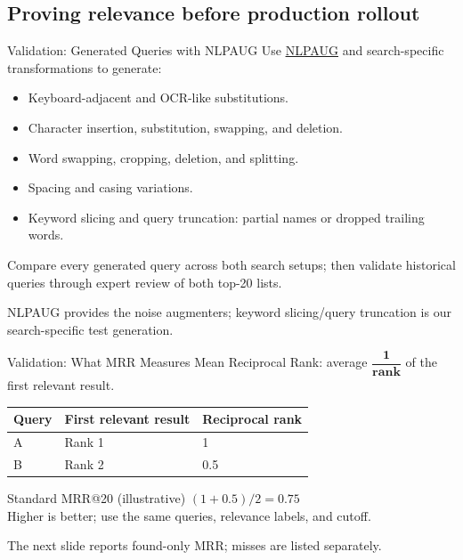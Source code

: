 \documentclass[aspectratio=169]{beamer}
\begin{document}
\subsection{Proving relevance before production rollout}

\begin{frame}{Validation: Generated Queries with NLPAUG}
  \hypertarget{sec:validation}{}
  Use \href{https://github.com/makcedward/nlpaug}{\underline{NLPAUG}} and search-specific transformations to generate:
  \begin{itemize}
    \item Keyboard-adjacent and OCR-like substitutions.
    \item Character insertion, substitution, swapping, and deletion.
    \item Word swapping, cropping, deletion, and splitting.
    \item Spacing and casing variations.
    \item Keyword slicing and query truncation: partial names or dropped trailing words.
  \end{itemize}
  \vspace{0.1cm}
  \small Compare every generated query across both search setups; then validate historical queries through expert review of both top-20 lists.
  \par\smallskip
  {\scriptsize\textcolor{MutedText}{NLPAUG provides the noise augmenters; keyword slicing/query truncation is our search-specific test generation.}}
\end{frame}

\begin{frame}{Validation: What MRR Measures}
  Mean Reciprocal Rank: average {\boldmath$\dfrac{\mathbf{1}}{\mathbf{rank}}$} of the first relevant result.
  \vspace{0.2cm}
  \begin{center}
    \begin{tabular}{lll}
      \toprule
      Query & First relevant result & Reciprocal rank \\
      \midrule
      A & Rank 1 & 1 \\
      B & Rank 2 & 0.5 \\
      \bottomrule
    \end{tabular}
  \end{center}
  \begin{block}{Standard MRR@20 (illustrative)}
    $(1 + 0.5) / 2 = 0.75$\\[0.1cm]
    Higher is better; use the same queries, relevance labels, and cutoff.
  \end{block}
  {\small\textcolor{MutedText}{The next slide reports found-only MRR; misses are listed separately.}}
\end{frame}
\end{document}

